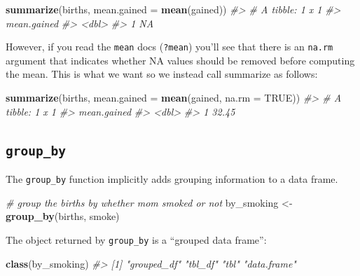 \documentclass[]{book}
\newenvironment{Shaded}{\begin{snugshade}}{\end{snugshade}}
\newcommand{\CommentTok}[1]{\textcolor[rgb]{0.56,0.35,0.01}{\textit{#1}}}
\newcommand{\DataTypeTok}[1]{\textcolor[rgb]{0.13,0.29,0.53}{#1}}
\newcommand{\KeywordTok}[1]{\textcolor[rgb]{0.13,0.29,0.53}{\textbf{#1}}}
\newcommand{\NormalTok}[1]{#1}
\newcommand{\OtherTok}[1]{\textcolor[rgb]{0.56,0.35,0.01}{#1}}
\newcommand{\StringTok}[1]{\textcolor[rgb]{0.31,0.60,0.02}{#1}}
\theoremstyle{definition}
\theoremstyle{definition}
\theoremstyle{definition}
\theoremstyle{remark}
\begin{document}
\begin{Shaded}
\begin{Highlighting}[]
\KeywordTok{summarize}\NormalTok{(births, }
          \DataTypeTok{mean.gained =} \KeywordTok{mean}\NormalTok{(gained))}
\CommentTok{#> # A tibble: 1 x 1}
\CommentTok{#>   mean.gained}
\CommentTok{#>         <dbl>}
\CommentTok{#> 1          NA}
\end{Highlighting}
\end{Shaded}

However, if you read the \texttt{mean} docs (\texttt{?mean}) you'll see
that there is an \texttt{na.rm} argument that indicates whether NA
values should be removed before computing the mean. This is what we want
so we instead call summarize as follows:

\begin{Shaded}
\begin{Highlighting}[]
\KeywordTok{summarize}\NormalTok{(births, }
          \DataTypeTok{mean.gained =} \KeywordTok{mean}\NormalTok{(gained, }\DataTypeTok{na.rm =} \OtherTok{TRUE}\NormalTok{))}
\CommentTok{#> # A tibble: 1 x 1}
\CommentTok{#>   mean.gained}
\CommentTok{#>         <dbl>}
\CommentTok{#> 1       32.45}
\end{Highlighting}
\end{Shaded}

\hypertarget{group_by}{%
\subsection{\texorpdfstring{\texttt{group\_by}}{group\_by}}\label{group_by}}

The \texttt{group\_by} function implicitly adds grouping information to
a data frame.

\begin{Shaded}
\begin{Highlighting}[]
\CommentTok{# group the births by whether mom smoked or not}
\NormalTok{by_smoking <-}\StringTok{ }\KeywordTok{group_by}\NormalTok{(births, smoke)}
\end{Highlighting}
\end{Shaded}

The object returned by \texttt{group\_by} is a ``grouped data frame'':

\begin{Shaded}
\begin{Highlighting}[]
\KeywordTok{class}\NormalTok{(by_smoking)}
\CommentTok{#> [1] "grouped_df" "tbl_df"     "tbl"        "data.frame"}
\end{Highlighting}
\end{Shaded}
\end{document}
